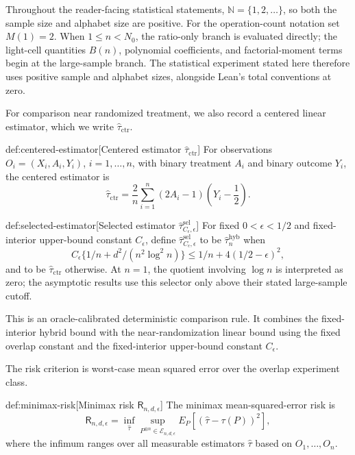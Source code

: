 Throughout the reader-facing statistical statements, \(\mathbb N=\{1,2,\ldots\}\), so both the sample size and alphabet size are positive. For the operation-count notation set \(M(1)=2\). When \(1\le n<N_0\), the ratio-only branch is evaluated directly; the light-cell quantities \(B(n)\), polynomial coefficients, and factorial-moment terms begin at the large-sample branch. The statistical experiment stated here therefore uses positive sample and alphabet sizes, alongside Lean's total conventions at zero.

For comparison near randomized treatment, we also record a centered linear estimator, which we write \(\widehat\tau_{\mathrm{ctr}}\).

\begin{definitionv}{def:centered-estimator}[Centered estimator \(\widehat\tau_{\mathrm{ctr}}\)]
For observations \(O_i=(X_i,A_i,Y_i)\), \(i=1,\ldots,n\), with binary treatment \(A_i\) and binary outcome \(Y_i\), the centered estimator is \[\widehat\tau_{\mathrm{ctr}}=\frac{2}{n}\sum_{i=1}^n(2A_i-1)\left(Y_i-\frac12\right).\]
\end{definitionv}

\begin{definitionv}{def:selected-estimator}[Selected estimator \(\widehat\tau^{\mathrm{sel}}_{C_\epsilon,\epsilon}\)]
For fixed \(0<\epsilon<1/2\) and fixed-interior upper-bound constant \(C_\epsilon\), define \(\widehat\tau^{\mathrm{sel}}_{C_\epsilon,\epsilon}\) to be \(\widehat\tau_n^{\mathrm{hyb}}\) when
\[
C_\epsilon\{1/n+d^2/(n^2\log^2 n)\}\le 1/n+4(1/2-\epsilon)^2,
\]
and to be \(\widehat\tau_{\mathrm{ctr}}\) otherwise. At \(n=1\), the quotient involving \(\log n\) is interpreted as zero; the asymptotic results use this selector only above their stated large-sample cutoff.
\end{definitionv}

This is an oracle-calibrated deterministic comparison rule. It combines the fixed-interior hybrid bound with the near-randomization linear bound using the fixed overlap constant and the fixed-interior upper-bound constant \(C_\epsilon\).

The risk criterion is worst-case mean squared error over the overlap experiment class.

\begin{definitionv}{def:minimax-risk}[Minimax risk \(\mathsf R_{n,d,\epsilon}\)]
The minimax mean-squared-error risk is
\[
\mathsf R_{n,d,\epsilon}
=
\inf_{\widehat\tau}
\sup_{P^{\otimes n}\in\mathcal E_{n,d,\epsilon}}
E_P\!\left[(\widehat\tau-\tau(P))^2\right],
\]
where the infimum ranges over all measurable estimators \(\widehat\tau\) based on \(O_1,\ldots,O_n\).
\end{definitionv}

